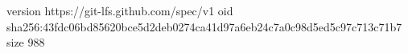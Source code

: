version https://git-lfs.github.com/spec/v1
oid sha256:43fdc06bd85620bce5d2deb0274ca41d97a6eb24c7a0c98d5ed5c97c713c71b7
size 988
